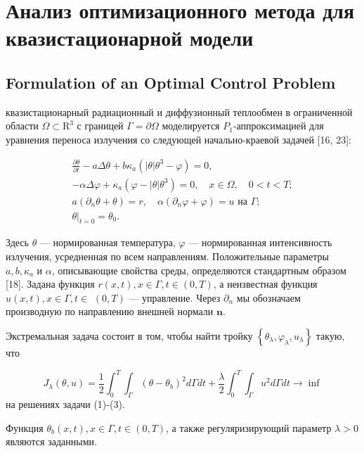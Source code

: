 \section{Анализ оптимизационного метода для квазистационарной модели}
\label{sec:ch2/sec3}

\subsection{Formulation of an Optimal Control Problem}
\label{subsec:ch2/sec3/subsec1}
квазистационарный радиационный и диффузионный теплообмен в ограниченной области
$\Omega \subset \mathrm{R}^{3}$ с границей $\Gamma=\partial \Omega$ моделируется
$P_{1}$-аппроксимацией для уравнения переноса излучения
со следующей начально-краевой задачей [16, 23]:

\[
\begin{gathered}
\frac{\partial \theta}{\partial t}-a \Delta \theta+b
\kappa_{a}\left(|\theta| \theta^{3}-\varphi\right)=0, \\
-\alpha \Delta \varphi+\kappa_{a}\left(\varphi-|\theta| \theta^{3}\right)=0,
\quad x \in \Omega, \quad 0<t<T; \\
a\left(\partial_{n} \theta+\theta\right)=r,
\quad \alpha\left(\partial_{n} \varphi+\varphi\right)=u \text { на } \Gamma; \\
\left.\theta\right|_{t=0}=\theta_{0}.
\end{gathered}
\]

Здесь $\theta$ — нормированная температура, $\varphi$ — нормированная интенсивность излучения,
усредненная по всем направлениям.
Положительные параметры $a, b, \kappa_{a}$ и $\alpha$, описывающие свойства среды,
определяются стандартным образом [18].
Задана функция $r(x, t), x \in \Gamma, t \in(0, T)$,
а неизвестная функция $u(x, t), x \in \Gamma, t \in$ $(0, T)$ — управление.
Через $\partial_{n}$ мы обозначаем производную по направлению внешней нормали $\mathbf{n}$.


Экстремальная задача состоит в том, чтобы найти тройку
$\left\{\theta_{\lambda}, \varphi_{\lambda}, u_{\lambda}\right\}$ такую, что

\[
J_{\lambda}(\theta, u)=\frac{1}{2} \int_{0}^{T}
\int_{\Gamma}\left(\theta-\theta_{b}\right)^{2} d \Gamma d t+\frac{\lambda}{2}
\int_{0}^{T} \int_{\Gamma} u^{2} d \Gamma d t \rightarrow \inf
\]
на решениях задачи (1)-(3).

Функция $\theta_{b}(x, t), x \in \Gamma, t \in(0, T)$,
а также регуляризирующий параметр $\lambda>0$ являются заданными.


